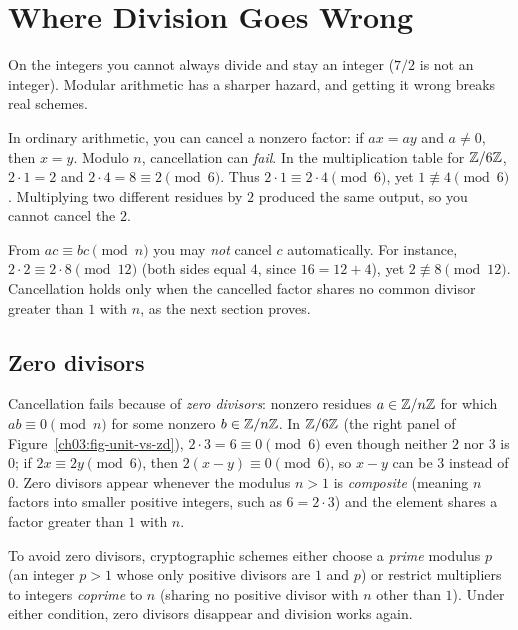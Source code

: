 \section{Where Division Goes Wrong}

On the integers you cannot always divide and stay an integer ($7/2$ is not an integer). Modular arithmetic has a sharper hazard, and getting it wrong breaks real schemes.

In ordinary arithmetic, you can cancel a nonzero factor: if $ax = ay$ and $a \ne 0$, then $x = y$. Modulo $n$, cancellation can \emph{fail}. In the multiplication table for $\mathbb{Z}/6\mathbb{Z}$, $2 \cdot 1 = 2$ and $2 \cdot 4 = 8 \equiv 2 \pmod{6}$. Thus $2\cdot 1 \equiv 2 \cdot 4 \pmod{6}$, yet $1 \not\equiv 4 \pmod{6}$. Multiplying two different residues by $2$ produced the same output, so you cannot cancel the $2$.

\begin{trapbox}
From $ac \equiv bc \pmod{n}$ you may \emph{not} cancel $c$ automatically. For instance, $2\cdot 2 \equiv 2 \cdot 8 \pmod{12}$ (both sides equal $4$, since $16 = 12 + 4$), yet $2 \not\equiv 8 \pmod{12}$. Cancellation holds only when the cancelled factor shares no common divisor greater than $1$ with $n$, as the next section proves.
\end{trapbox}

\subsection{Zero divisors}

Cancellation fails because of \emph{zero divisors}: nonzero residues $a \in \mathbb{Z}/n\mathbb{Z}$ for which $ab \equiv 0 \pmod{n}$ for some nonzero $b \in \mathbb{Z}/n\mathbb{Z}$. In $\mathbb{Z}/6\mathbb{Z}$ (the right panel of Figure~\ref{ch03:fig-unit-vs-zd}), $2 \cdot 3 = 6 \equiv 0 \pmod{6}$ even though neither $2$ nor $3$ is $0$; if $2x \equiv 2y \pmod{6}$, then $2(x-y) \equiv 0 \pmod{6}$, so $x - y$ can be $3$ instead of $0$. Zero divisors appear whenever the modulus $n > 1$ is \emph{composite} (meaning $n$ factors into smaller positive integers, such as $6 = 2\cdot 3$) and the element shares a factor greater than $1$ with $n$.

To avoid zero divisors, cryptographic schemes either choose a \emph{prime} modulus $p$ (an integer $p > 1$ whose only positive divisors are $1$ and $p$) or restrict multipliers to integers \emph{coprime} to $n$ (sharing no positive divisor with $n$ other than $1$). Under either condition, zero divisors disappear and division works again.

